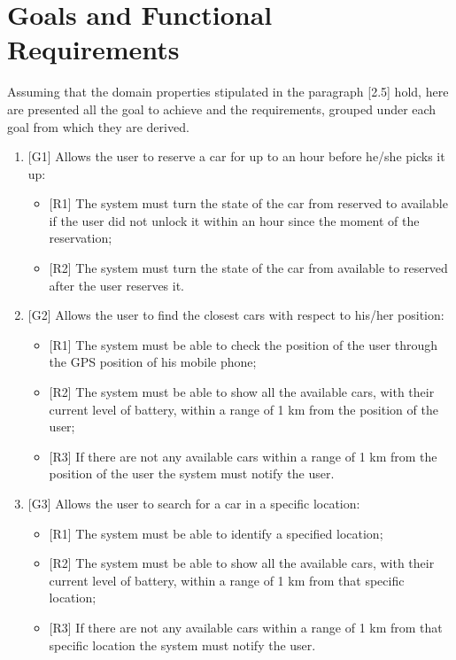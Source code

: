 \section{Goals and Functional Requirements}
Assuming that the domain properties stipulated in the paragraph [2.5] hold, here are presented all the goal to  achieve and the requirements, grouped under each goal from which they are derived.

\begin{enumerate}

\item {[G1]} Allows the user to reserve a car for up to an hour before he/she picks it up:

\begin{itemize}
	\item {[R1]} The system must turn the state of the car from reserved to available if the user did not unlock it within an hour since the moment of the reservation;
	\item {[R2]} The system must turn the state of the car from available to reserved after the user reserves it.
\end{itemize}

\item {[G2]} Allows the user to find the closest cars with respect to his/her position:

\begin{itemize}
	\item {[R1]} The system must be able to check the position of the user through the GPS position of his mobile phone;
	\item {[R2]} The system must be able to show all the available cars, with their current level of battery, within a range of 1 km from the position of the user;
	\item {[R3]} If there are not any available cars within a range of 1 km from the position of the user the system must notify the user.
\end{itemize}

\item {[G3]} Allows the user to search for a car in a specific location:

\begin{itemize}
	\item {[R1]} The system must be able to identify a specified location;
	\item {[R2]} The system must be able to show all the available cars, with their current level of battery, within a range of 1 km from that specific location;
	\item {[R3]} If there are not any available cars within a range of 1 km from that specific location the system must notify the user.
\end{itemize}


\end{enumerate}
